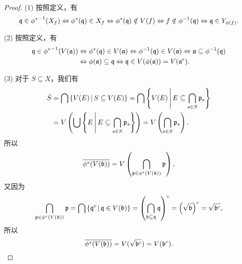 \begin{proof}
  (1) 按照定义，有
  \[
    \mathfrak{q}\in {\phi^*}^{-1}(X_f)\Leftrightarrow
    \phi^*(\mathfrak{q})\in X_f \Leftrightarrow
    \phi^*(\mathfrak{q})\notin V(f)  \Leftrightarrow
    f\notin\phi^{-1}(\mathfrak{q}) \Leftrightarrow
    \mathfrak{q}\in Y_{\phi(f)}.
  \]

  (2) 按照定义，有
  \begin{align*}
    \mathfrak{q}\in {\phi^*}^{-1}(V(\mathfrak{a}))&\Leftrightarrow\phi^*(\mathfrak{q})\in V(\mathfrak{a})
    \Leftrightarrow\phi^{-1}(\mathfrak{q})\in V(\mathfrak{a})\Leftrightarrow
    \mathfrak{a}\subseteq\phi^{-1}(\mathfrak{q})\\
    &\Leftrightarrow\phi(\mathfrak{a})\subseteq \mathfrak{q}\Leftrightarrow
    \mathfrak{q}\in V(\phi(\mathfrak{a}))=V(\mathfrak{a}^e).
  \end{align*}

  (3) 对于 $S\subseteq X$，我们有
  \begin{align*}
    \bar{S}&=\bigcap\left\{V(E)\,\middle|\, S\subseteq V(E)\right\}  
    =\bigcap\left\{V(E)\,\middle|\, E\subseteq \bigcap_{s\in S}\mathfrak{p}_s\right\}  \\
    &=V\left(\bigcup\left\{E\,\middle|\, E\subseteq \bigcap_{s\in S}\mathfrak{p}_s\right\}\right)
    =V\left(\bigcap_{s\in S}\mathfrak{p}_s\right).
  \end{align*}
  所以
  \[
    \overline{\phi^*(V(\mathfrak{b}))}  =
    V\left(\bigcap_{\mathfrak{p}\in \phi^*(V(\mathfrak{b}))}\mathfrak{p}\right),
  \]
  又因为
  \[
    \bigcap_{\mathfrak{p}\in \phi^*(V(\mathfrak{b}))}\mathfrak{p}
    =\bigcap \left\{\mathfrak{q}^c\,\middle|\, \mathfrak{q}\in V(\mathfrak{b})\right\}
    =\left(\bigcap_{\mathfrak{b}\subseteq\mathfrak{q}}\mathfrak{q}\right)^c
    =\left(\sqrt{\mathfrak{b}}\right)^c=\sqrt{\mathfrak{b}^c},
  \]
  所以
  \[
    \overline{\phi^*(V(\mathfrak{b}))} =V(\sqrt{\mathfrak{b}^c})=V(\mathfrak{b}^c).
  \]


\end{proof}
